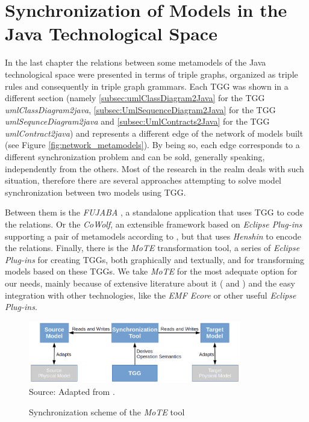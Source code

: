 \documentclass[tuberlin,cic,tc,english,noabntcite, oneside]{iiufrgs}
\begin{document}
\chapter{Synchronization of Models in the Java Technological Space}
\label{chapter:metamodel_synchronization}

In the last chapter the relations between some metamodels of the Java technological space were presented in terms of triple graphs, organized as triple rules and consequently in triple graph grammars. Each TGG was shown in a different section (namely \ref{subsec:umlClassDiagram2Java} for the TGG \emph{umlClassDiagram2java}, \ref{subsec:UmlSequenceDiagram2Java} for the TGG \emph{umlSequnceDiagram2java} and \ref{subsec:UmlContracts2Java} for the TGG \emph{umlContract2java}) and represents a different edge of the network of models built (see Figure \ref{fig:network_metamodels}). By being so, each edge corresponds to a different synchronization problem and can be sold, generally speaking, independently from the others. Most of the research in the realm deals with such situation, therefore there are several approaches attempting to solve model synchronization between two models using TGG.

Between them is the \emph{FUJABA} \citep{nickel2000fujaba}, a standalone application that uses TGG to code the relations. Or the \emph{CoWolf}, an extensible framework based on \emph{Eclipse Plug-ins} supporting a pair of metamodels according to \citet{getir2015cowolf}, but that uses \emph{Henshin} \citep{arendt2010henshin} to encode the relations. Finally, there is the \emph{MoTE} transformation tool, a series of \emph{Eclipse Plug-ins} for creating TGGs, both graphically and textually, and for transforming models based on these TGGs. We take \emph{MoTE} for the most adequate option for our needs, mainly because of extensive literature about it (\citep{giese2009efficient} and \citep{hildebrandt2012mdelab}) and the easy integration with other technologies, like the \emph{EMF Ecore} or other useful \emph{Eclipse Plug-ins}.

\begin{figure}[H]
	\centering
    \caption{Synchronization scheme of the \emph{MoTE} tool}
    \includegraphics[width=25em]{MoTE_scheme} \\
    Source: Adapted from \citep{giese2010model}.
    \label{fig:MoTE_scheme}
\end{figure}
\end{document}
